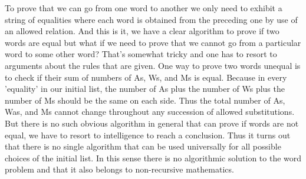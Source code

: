 \documentclass[a4page]{exam}
\begin{document}
\begin{itemize}
To prove that we can go from one word to another we only need to exhibit a string of equalities where each word is obtained from the preceding one by use of an allowed relation. And this is it, we have a clear algorithm to prove if two words are equal but what if we need to prove that we cannot go from a particular word to some other word? That’s somewhat tricky and one has to resort to arguments about the rules that are given. One way to prove two words unequal is to check if their sum of numbers of As, Ws, and Ms is equal. Because in every 'equality' in our initial list, the number of As plus the number of Ws plus the number of Ms should be the same on each side. Thus the total number of As, Was, and Ms cannot change throughout any succession of allowed substitutions. But there is no such obvious algorithm in general that can prove if words are not equal, we have to resort to intelligence to reach a conclusion. Thus it turns out that there is no single algorithm that can be used universally for all possible choices of the initial list. In this sense there is no algorithmic solution to the word problem and that it also belongs to non-recursive mathematics.


\end{itemize}
\end{document}
